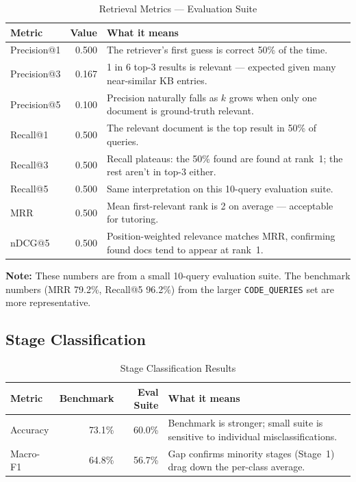 \documentclass[12pt,a4paper]{article}
\begin{document}
\begin{table}[h!]
\centering
\caption{Retrieval Metrics --- Evaluation Suite}
\small
\begin{tabularx}{\textwidth}{lrX}
\toprule
Metric & Value & What it means \\
\midrule
Precision@1 & 0.500 & The retriever's first guess is correct 50\% of the time. \\
Precision@3 & 0.167 & 1 in 6 top-3 results is relevant --- expected given many near-similar KB entries. \\
Precision@5 & 0.100 & Precision naturally falls as $k$ grows when only one document is ground-truth relevant. \\
Recall@1    & 0.500 & The relevant document is the top result in 50\% of queries. \\
Recall@3    & 0.500 & Recall plateaus: the 50\% found are found at rank~1; the rest aren't in top-3 either. \\
Recall@5    & 0.500 & Same interpretation on this 10-query evaluation suite. \\
MRR         & 0.500 & Mean first-relevant rank is 2 on average --- acceptable for tutoring. \\
nDCG@5      & 0.500 & Position-weighted relevance matches MRR, confirming found docs tend to appear at rank~1. \\
\bottomrule
\end{tabularx}
\end{table}

\textbf{Note:} These numbers are from a small 10-query evaluation suite. The benchmark numbers (MRR 79.2\%, Recall@5 96.2\%) from the larger \texttt{CODE\_QUERIES} set are more representative.

\subsection{Stage Classification}

\begin{table}[h!]
\centering
\caption{Stage Classification Results}
\begin{tabular}{lrrl}
\toprule
Metric & Benchmark & Eval Suite & What it means \\
\midrule
Accuracy  & 73.1\% & 60.0\% & Benchmark is stronger; small suite is sensitive to individual misclassifications. \\
Macro-F1  & 64.8\% & 56.7\% & Gap confirms minority stages (Stage~1) drag down the per-class average. \\
\bottomrule
\end{tabular}
\end{table}
\end{document}

